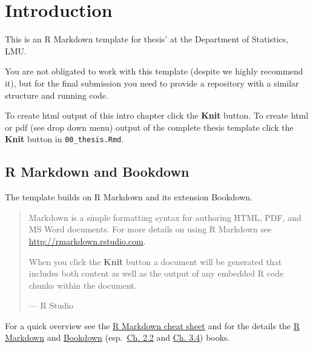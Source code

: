 \documentclass[
]{scrartcl}
\begin{document}
\newpage

{
\hypersetup{linkcolor=}
\setcounter{tocdepth}{2}
\tableofcontents
}
\newpage
\listoffigures
\newpage


\hypertarget{sec:intro}{%
\section{Introduction}\label{sec:intro}}

This is an R Markdown template for thesis' at the Department of Statistics, LMU.

You are not obligated to work with this template (despite we highly recommend it), but for the final submission you need
to provide a repository with a similar structure and running code.

To create html output of this intro chapter click the \textbf{Knit} button. To create html or pdf (see drop down menu) output of
the complete thesis template click the \textbf{Knit} button in \texttt{00\_thesis.Rmd}.

\hypertarget{r-markdown-and-bookdown}{%
\subsection{R Markdown and Bookdown}\label{r-markdown-and-bookdown}}

The template builds on R Markdown and its extension Bookdown.

\begin{quote}
Markdown is a simple formatting syntax for authoring HTML, PDF, and MS Word documents. For more details on using R
Markdown see \url{http://rmarkdown.rstudio.com}.

When you click the \textbf{Knit} button a document will be generated that includes both content as well as the output of any
embedded R code chunks within the document.

--- R Studio
\end{quote}

For a quick overview see the \href{https://raw.githubusercontent.com/rstudio/cheatsheets/main/rmarkdown.pdf}{R Markdown cheat sheet}
and for the details the \href{https://bookdown.org/yihui/rmarkdown}{R Markdown} and \href{https://bookdown.org/yihui/bookdown/}{Bookdown}
(esp.~\href{https://bookdown.org/yihui/bookdown/markdown-extensions-by-bookdown.html}{Ch. 2.2} and \href{https://bookdown.org/yihui/bookdown/a-single-document.html}{Ch. 3.4}) books.
\end{document}
